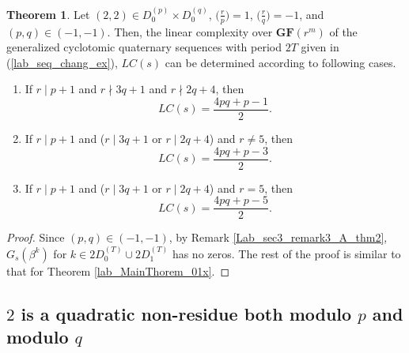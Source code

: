 \documentclass{mcom-l}
\theoremstyle{definition}
\newtheorem{sec3thm1xx}[sec3thm1]{Theorem}
\numberwithin{equation}{section}
\begin{document}
       \begin{sec3thm1xx}\label{lab_MainThorem_01xx}
       Let $ (2,2) \in  D_{0}^{(p)}\times D_{0}^{(q)}$, $ \bigl(\tfrac{r}{p}\bigr) =1 $, $ \bigl(\tfrac{r}{q}\bigr) =-1 $, and $ (p,q)\in (-1,-1) $. Then, the linear complexity over $ \mathbf{GF}(r^{m}) $ of the generalized cyclotomic quaternary sequences with period $ 2T $ given in (\ref{lab_seq_chang_ex}), $  LC(s) $ can be determined according to following cases.
           \begin{enumerate} \item If   $ r\mid p+1 $ and $ r\nmid 3q+1 $ and $ r\nmid 2q+4 $, then
           \begin{equation*}
              LC(s)=\frac{4pq+p-1}{2}.
           \end{equation*}
            \item If  $ r\mid p+1 $ and ($ r\mid 3q+1 $ or $ r\mid 2q+4 $) and $ r\ne 5$, then
               \begin{equation*}
               LC(s)=\frac{4pq+p-3}{2}.
                \end{equation*}
            \item If  $ r\mid p+1 $ and ($ r\mid 3q+1 $ or $ r\mid 2q+4 $) and $ r= 5$, then
                 \begin{equation*}
                   LC(s)=\frac{4pq+p-5}{2}.
                 \end{equation*}
                 \end{enumerate}
       \end{sec3thm1xx} 
        \begin{proof}
        Since $ (p,q)\in (-1,-1) $, by Remark \ref{Lab_sec3_remark3_A_thm2}, $ G_{s}(\beta^{k}) $ for $ k\in 2D_{0}^{(T)}\cup 2D_{1}^{(T)} $ has no zeros. The rest of the proof is similar to that for Theorem \ref{lab_MainThorem_01x}.
        \end{proof}
 \subsection{$ 2 $ is a quadratic non-residue both modulo $ p $ and modulo $ q $}  
    
\end{document}
